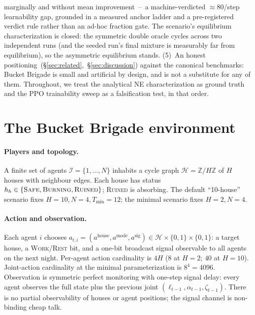 \documentclass{anvil-paper}
\begin{document}
marginally and without mean improvement~--~a machine-verdicted
${\approx}80$/step learnability gap, grounded in a measured anchor
ladder and a pre-registered verdict rule rather than an ad-hoc fraction
gate. The scenario's equilibrium characterization is closed: the
symmetric double oracle cycles across two independent runs (and the
seeded run's final mixture is measurably far from equilibrium), so the
asymmetric equilibrium stands. (5)~An honest
positioning~(\S\ref{sec:related},~\S\ref{sec:discussion}) against the
canonical benchmarks: Bucket Brigade is small and artificial by design,
and is not a substitute for any of them.
Throughout, we treat the analytical NE characterization as ground truth and
the PPO trainability sweep as a falsification test, in that order.

\section{The Bucket Brigade environment}
\label{sec:env}

\paragraph{Players and topology.}
A finite set of agents $\mathcal{I}{=}\{1,\ldots,N\}$ inhabits a cycle graph
$\mathcal{H}{=}\mathbb{Z}/H\mathbb{Z}$ of $H$ houses with neighbour edges. Each
house has status $h_h\in\{\textsc{Safe},\textsc{Burning},\textsc{Ruined}\}$;
\textsc{Ruined} is absorbing. The default ``10-house'' scenario fixes
$H{=}10,N{=}4,T_{\min}{=}12$; the minimal scenario fixes $H{=}2,N{=}4$.

\paragraph{Action and observation.}
Each agent $i$ chooses
$a_{t,i}{=}(a^{\text{house}},a^{\text{mode}},a^{\text{sig}})\in
\mathcal{H}\times\{0,1\}\times\{0,1\}$: a target house, a
\textsc{Work}/\textsc{Rest} bit, and a one-bit broadcast signal observable to
all agents on the next night. Per-agent action cardinality is $4H$ ($8$ at
$H{=}2$; $40$ at $H{=}10$). Joint-action cardinality at the minimal
parameterization is $8^4{=}4096$. Observation is symmetric perfect monitoring
with one-step signal delay: every agent observes the full state plus the
previous joint $(\ell_{t-1},\alpha_{t-1},\zeta_{t-1})$. There is no partial
observability of houses or agent positions; the signal channel is
non-binding cheap talk.
\end{document}
